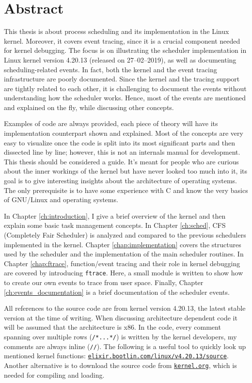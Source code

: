 \chapter{Abstract}
This thesis is about process scheduling and its implementation in the Linux kernel. Moreover, it covers event tracing, since it is a crucial component needed for kernel debugging. 
The focus is on illustrating the scheduler implementation in Linux kernel version 4.20.13 (released on 27--02--2019), as well as documenting scheduling-related events. In fact, both the kernel and the event tracing infrastructure are poorly documented.
Since the kernel and the tracing support are tightly related to each other, it is challenging to document the events without understanding how the scheduler works. Hence, most of the events are mentioned and explained on the fly, while discussing other concepts.

Examples of code are always provided, each piece of theory will have its implementation counterpart shown and explained.
Most of the concepts are very easy to visualize once the code is split into its most significant parts
and then dissected line by line; however, this is not an internals manual for development. 
This thesis should be considered a guide. It's meant for people who are curious about the inner workings of the kernel
but have never looked too much into it, its goal is to give interesting insights about the architecture of operating systems.
The only prerequisite is to have some experience with C and know the very basics of GNU/Linux and operating systems.

In Chapter \ref{ch:introduction}, I give a brief overview of the kernel and then explain some basic task management concepts. 
In Chapter \ref{ch:sched}, CFS (Completely Fair Scheduler) is analyzed and compared to the previous schedulers implemented in the kernel. 
Chapter \ref{chap:implementation} covers the structures used by the scheduler and the implementation of the main scheduler routines.
In Chapter \ref{chap:ftrace}, function/event tracing and their role in kernel debugging are covered by introducing \verb|ftrace|. Here, a small module is written to show how to create our own events to trace from user space.
Finally, Chapter \ref{ch:events_documentation} is a brief documentation of the scheduler events.

All references to the source code are from kernel version 4.20.13, the latest stable version at the time of writing. When discussing architecture dependent code it will be assumed that the architecture is x86. In the code, every comment spanning over multiple rows (\verb|/*...*/|) is written by the kernel developers, my comments are always inline (\verb|//|). The following is a useful tool to quickly look up mentioned kernel functions: \href{https://elixir.bootlin.com/linux/v4.20.13/source}{\texttt{elixir.bootlin.com/linux/v4.20.13/source}}. Another alternative is to download the source code from \href{https://www.kernel.org/}{\texttt{kernel.org}}, which is needed for compiling and loading. 
